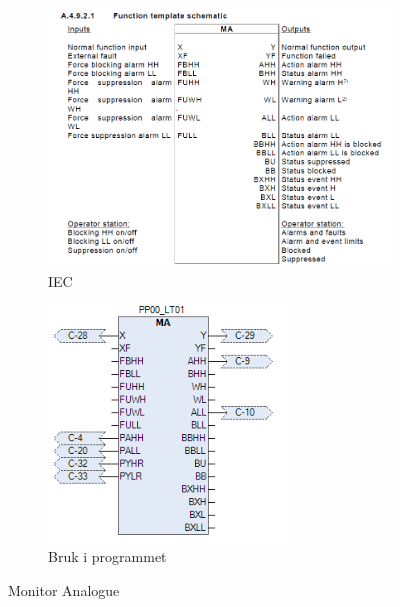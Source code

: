 \begin{figure}[htbp]
    \centering
    \begin{subfigure}[b]{0.45\textwidth}
        \centering
        \includegraphics[width=1\textwidth]{Bilder/MABlokkIEC.png}
        \caption{IEC}\label{fig:Monitor Analogue blokk IEC}
    \end{subfigure}
    \hfill
    \begin{subfigure}[b]{0.45\textwidth}
        \centering
        \includegraphics[width=0.7\textwidth]{Bilder/MABlokkIProgrammet.png}
        \caption{Bruk i programmet}\label{fig:Monitor Analogue blokk i programmet}
    \end{subfigure}
    \caption{Monitor Analogue}\label{fig:Monitor Analogue}
\end{figure}
\newpage

